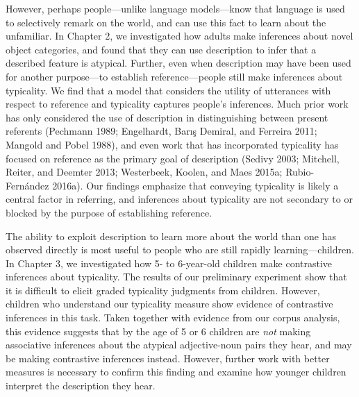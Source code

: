 \documentclass{ucetd}
\begin{document}
However, perhaps people---unlike language models---know that language is
used to selectively remark on the world, and can use this fact to learn
about the unfamiliar. In Chapter 2, we investigated how adults make
inferences about novel object categories, and found that they can use
description to infer that a described feature is atypical. Further, even
when description may have been used for another purpose---to establish
reference---people still make inferences about typicality. We find that
a model that considers the utility of utterances with respect to
reference and typicality captures people's inferences. Much prior work
has only considered the use of description in distinguishing between
present referents (Pechmann 1989; Engelhardt, Barış Demiral, and
Ferreira 2011; Mangold and Pobel 1988), and even work that has
incorporated typicality has focused on reference as the primary goal of
description (Sedivy 2003; Mitchell, Reiter, and Deemter 2013;
Westerbeek, Koolen, and Maes 2015a; Rubio-Fernández 2016a). Our findings
emphasize that conveying typicality is likely a central factor in
referring, and inferences about typicality are not secondary to or
blocked by the purpose of establishing reference.

The ability to exploit description to learn more about the world than
one has observed directly is most useful to people who are still rapidly
learning---children. In Chapter 3, we investigated how 5- to 6-year-old
children make contrastive inferences about typicality. The results of
our preliminary experiment show that it is difficult to elicit graded
typicality judgments from children. However, children who understand our
typicality measure show evidence of contrastive inferences in this task.
Taken together with evidence from our corpus analysis, this evidence
suggests that by the age of 5 or 6 children are \emph{not} making
associative inferences about the atypical adjective-noun pairs they
hear, and may be making contrastive inferences instead. However, further
work with better measures is necessary to confirm this finding and
examine how younger children interpret the description they hear.
\end{document}
